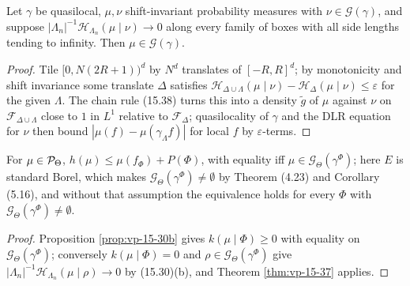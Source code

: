 \begin{theorem}[Georgii (15.37)]
    \label{thm:vp-15-37}
    \leanok

    Let $\gamma$ be quasilocal, $\mu, \nu$ shift-invariant probability measures with
    $\nu \in \mathcal G(\gamma)$, and suppose $|\Lambda_n|^{-1}\mathcal H_{\Lambda_n}(\mu \mid \nu) \to 0$
    along every family of boxes with all side lengths tending to infinity. Then
    $\mu \in \mathcal G(\gamma)$.
\end{theorem}
\begin{proof}
    \leanok
    Tile $[0, N(2R+1))^d$ by $N^d$ translates of $[-R,R]^d$; by monotonicity and shift
    invariance some translate $\Delta$ satisfies
    $\mathcal H_{\Delta \cup \Lambda}(\mu\mid\nu) - \mathcal H_{\Delta}(\mu\mid\nu) \leq \varepsilon$
    for the given $\Lambda$. The chain rule (15.38) turns this into a density
    $\tilde g$ of $\mu$ against $\nu$ on $\mathcal F_{\Delta\cup\Lambda}$ close to $1$ in
    $L^1$ relative to $\mathcal F_\Delta$; quasilocality of $\gamma$ and the DLR equation for
    $\nu$ then bound $|\mu(f) - \mu(\gamma_\Lambda f)|$ for local $f$ by $\varepsilon$-terms.
\end{proof}

\begin{theorem}
    \label{thm:vp-15-39}
    \leanok

    For $\mu \in \mathcal{P}_\Theta$, $h(\mu) \leq \mu(f_\Phi) + P(\Phi)$, with equality iff
    $\mu \in \mathcal G_\Theta(\gamma^\Phi)$; here $E$ is standard Borel, which makes
    $\mathcal G_\Theta(\gamma^\Phi) \neq \emptyset$ by Theorem (4.23) and Corollary (5.16), and
    without that assumption the equivalence holds for every $\Phi$ with
    $\mathcal G_\Theta(\gamma^\Phi) \neq \emptyset$.
\end{theorem}
\begin{proof}
    \leanok
    Proposition \ref{prop:vp-15-30b} gives $k(\mu\mid\Phi) \geq 0$ with equality on
    $\mathcal G_\Theta(\gamma^\Phi)$; conversely $k(\mu\mid\Phi) = 0$ and
    $\rho \in \mathcal G_\Theta(\gamma^\Phi)$ give $|\Lambda_n|^{-1}\mathcal H_{\Lambda_n}(\mu\mid\rho) \to 0$
    by (15.30)(b), and Theorem \ref{thm:vp-15-37} applies.
\end{proof}

